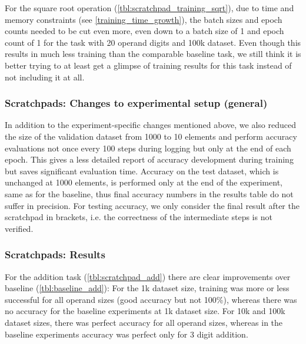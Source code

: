 For the square root operation (\cref{tbl:scratchpad_training_sqrt}), due to time and memory constraints (see \cref{training_time_growth}), the batch sizes and epoch counts needed to be cut even more, even down to a batch size of 1 and epoch count of 1 for the task with 20 operand digits and 100k dataset. Even though this results in much less training than the comparable baseline task, we still think it is better trying to at least get a glimpse of training results for this task instead of not including it at all.

\subsubsection{Scratchpads: Changes to experimental setup (general)}

In addition to the experiment-specific changes mentioned above, we also reduced the size of the validation dataset from 1000 to 10 elements and perform accuracy evaluations not once every 100 steps during logging but only at the end of each epoch. This gives a less detailed report of accuracy development during training but saves significant evaluation time. Accuracy on the test dataset, which is unchanged at 1000 elements, is performed only at the end of the experiment, same as for the baseline, thus final accuracy numbers in the results table do not suffer in precision.
For testing accuracy, we only consider the final result after the scratchpad in brackets, i.e. the correctness of the intermediate steps is not verified.

\subsubsection{Scratchpads: Results}


For the addition task  (\cref{tbl:scratchpad_add}) there are clear improvements over baseline (\cref{tbl:baseline_add}): For the 1k dataset size, training was more or less successful for all operand sizes (good accuracy but not 100\%), whereas there was no accuracy for the baseline experiments at 1k dataset size.
For 10k and 100k dataset sizes, there was perfect accuracy for all operand sizes, whereas in the baseline experiments accuracy was perfect only for 3 digit addition.

